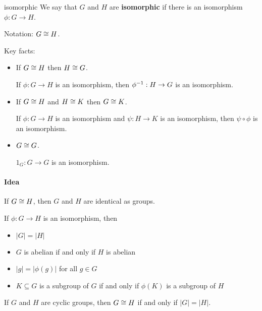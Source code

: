 \begin{defn}{isomorphic}
We say that $G$ and $H$ are \textbf{isomorphic} if there is an isomorphism $\phi:G\to H$.

Notation: $G\cong H$.
\end{defn}

Key facts:
\begin{itemize}
\item If $G\cong H$ then $H\cong G$.
\begin{pf}
	If $\phi:G\to H$ is an isomorphism, then $\phi^{-1}:H\to G$ is an isomorphism.
\end{pf}
\item If $G\cong H$ and $H\cong K$ then $G\cong K$.
\begin{pf}
	If $\phi:G\to H$ is an isomorphism and $\psi:H\to K$ is an isomorphism, then $\psi\circ \phi$ is an isomorphism.
\end{pf}
\item $G\cong G$.
\begin{pf}
$1_G:G\to G$ is an isomorphism.
\end{pf}
\end{itemize}


\paragraph{Idea} If $G\cong H$, then $G$ and $H$ are identical as groups.

If $\phi:G\to H$ is an isomorphism, then
\begin{itemize}
\item $|G|=|H|$
\item $G$ is abelian if and only if $H$ is abelian
\item $|g| = |\phi(g)|$ for all $g\in G$
\item $K\subseteq G$ is a subgroup of $G$ if and only if $\phi(K)$ is a subgroup of $H$
\end{itemize}

\begin{prop}
If $G$ and $H$ are cyclic groups, then $G\cong H$ if and only if $|G|=|H|$.
\end{prop}

